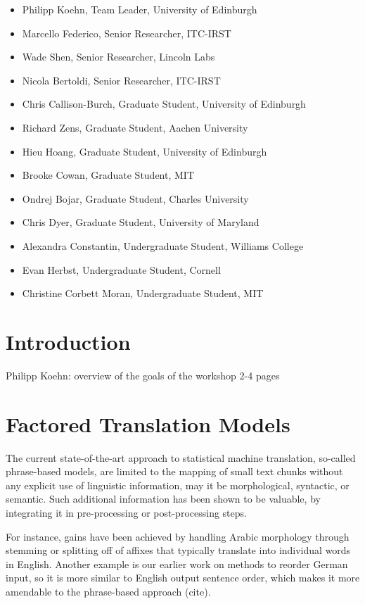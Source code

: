 \documentclass[11pt]{book}
\theoremstyle{plain}
\begin{document}
\begin{itemize}
\item Philipp Koehn, Team Leader, University of Edinburgh
\item Marcello Federico, Senior Researcher, ITC-IRST
\item Wade Shen, Senior Researcher, Lincoln Labs
\item Nicola Bertoldi, Senior Researcher, ITC-IRST
\item Chris Callison-Burch, Graduate Student, University of Edinburgh
\item Richard Zens, Graduate Student, Aachen University
\item Hieu Hoang, Graduate Student, University of Edinburgh
\item Brooke Cowan, Graduate Student, MIT
\item Ondrej Bojar, Graduate Student, Charles University
\item Chris Dyer, Graduate Student, University of Maryland
\item Alexandra Constantin, Undergraduate Student, Williams College
\item Evan Herbst, Undergraduate Student, Cornell
\item Christine Corbett Moran, Undergraduate Student, MIT
\end{itemize}

\tableofcontents

\chapter{Introduction}
{\sc Philipp Koehn: overview of the goals of the workshop 2-4 pages}

\chapter{Factored Translation Models}
The current state-of-the-art approach to statistical machine translation, so-called phrase-based models, are limited to the mapping of small text chunks without any explicit use of linguistic information, may it be morphological, syntactic, or semantic. Such additional information has been shown to be valuable, by integrating it in pre-processing or post-processing steps. 

For instance, gains have been achieved by handling Arabic morphology through stemming or splitting off of affixes that typically translate into individual words in English. Another example is our earlier work on methods to reorder German input, so it is more similar to English output sentence order, which makes it more amendable to the phrase-based approach ({\sc cite}).
\end{document}
